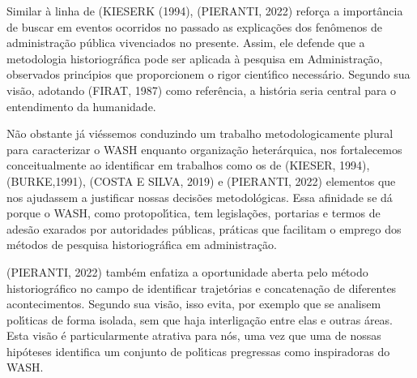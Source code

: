 \documentclass[
12pt,		%
openright,	%
twoside,  %
a4paper,			%
chapter=TITLE,		%
english,			%
french,				%
spanish,			%
brazil				%
]{USPSC-classe/USPSC}
\begin{document}
Similar \`a linha de (KIESERK (1994),  (PIERANTI, 2022) refor\c{c}a a import\^ancia de buscar em eventos ocorridos no passado as explica\c{c}\~oes dos fen\^omenos de administra\c{c}\~ao p\'ublica vivenciados no presente. Assim, ele defende que \textquotedbl a metodologia historiogr\'afica pode ser aplicada \`a pesquisa em Administra\c{c}\~ao\textquotedbl , observados princ\'{\i}pios que proporcionem o rigor cient\'{\i}fico necess\'ario. Segundo sua vis\~ao, adotando (FIRAT, 1987) como refer\^encia, a hist\'oria seria \textquotedbl central para o entendimento da humanidade\textquotedbl .

















N\~ao obstante j\'a vi\'essemos conduzindo um trabalho metodologicamente plural para caracterizar o WASH enquanto organiza\c{c}\~ao heter\'arquica, nos fortalecemos conceitualmente ao identificar em trabalhos como os de (KIESER, 1994), (BURKE,1991), (COSTA E SILVA, 2019) e (PIERANTI, 2022) elementos que nos ajudassem a justificar nossas decis\~oes metodol\'ogicas. Essa afinidade se d\'a porque o WASH, como protopol\'{\i}tica, tem legisla\c{c}\~oes, portarias e termos de ades\~ao exarados por autoridades p\'ublicas, pr\'aticas que facilitam o emprego dos m\'etodos de pesquisa historiogr\'afica em administra\c{c}\~ao.

















(PIERANTI, 2022) tamb\'em enfatiza a oportunidade aberta pelo m\'etodo historiogr\'afico  no campo de identificar trajet\'orias e concatena\c{c}\~ao de diferentes acontecimentos. Segundo sua vis\~ao, \textquotedbl isso evita, por exemplo que se analisem pol\'{\i}ticas de forma isolada, sem que haja interliga\c{c}\~ao entre elas e outras \'areas\textquotedbl . Esta vis\~ao \'e particularmente atrativa para n\'os, uma vez que uma de nossas hip\'oteses identifica um conjunto de pol\'{\i}ticas pregressas como inspiradoras do WASH.
\end{document}
